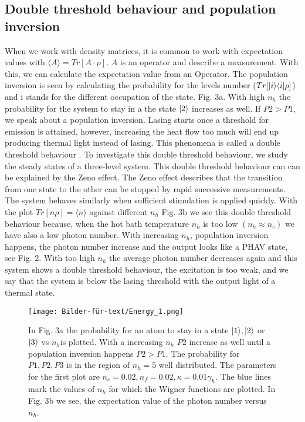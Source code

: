 \documentclass[12pt,a4paper]{article}
\DeclarePairedDelimiter\bra{\langle}{\rvert}
\DeclarePairedDelimiter\ket{\lvert}{\rangle}
\begin{document}
\newpage
\subsection{Double threshold behaviour and population inversion}
 When we work with density matrices, it is common to work with expectation values with $\langle A \rangle=Tr[A\cdot\rho]$.
 $A$ is an operator and describe a measurement.
With this, we can calculate the expectation value from an Operator. 
The population inversion is seen by calculating the probability for the levels number ($Tr[\ket{i}\bra{i} \rho]$) and i stands for the different occupation of the state. Fig. 3a.  With high $n_h$ the probability for the system to stay in a the state $\ket{2}$ increases as well. If $P2>P1$, we speak about a population inversion.  
Lasing starts once a threshold for emission is attained, however, increasing the heat flow too much will end up producing  thermal light instead of lasing. This phenomena is called a double threshold behaviour \cite{Li2017}. To investigate this double threshold behaviour, we study the steady states of a three-level system.
This double threshold behaviour can can be explained by the Zeno effect. 
The Zeno effect describes that the transition from one state to the other can be stopped by rapid successive measurements. 
The system behaves similarly when sufficient stimulation is applied quickly. 
With the plot  $Tr[n\rho] =\langle n\rangle$ against different $n_h$ Fig. 3b we see this double threshold behaviour because, when the hot bath temperature $n_h$ is too low $(n_h \approx n_c)$ we have also a  low photon number. With increasing $n_h$, population inversion happens, the photon number increase and the output looks like a PHAV state,  see  Fig. 2. With too high $n_h$ the average photon number decreases again and this system shows a double threshold behaviour, the excitation is too weak, and we say that the system is below the lasing threshold with the output light of a thermal state.
\begin{figure}[h!]
\hspace{-1cm}
\texttt{[image: Bilder-für-text/Energy\_1.png]}
\caption{In Fig. 3a the probability for an atom to stay in a state $\ket{1}, \ket{2}$ or $\ket{3}$ vs $n_h$is plotted. With a increasing $n_h$ $P2$ increase as well until a population inversion happens $P2>P1$. The probability for $P1,P2,P3$ is in the region of $n_h=5 $ well distributed. The parameters for the first plot are $n_c=0.02 ,n_f=0.02,\kappa=0.01\gamma_h $. The blue lines mark the values of $ n_h$ for which the Wigner functions are plotted. In Fig. 3b we see, the expectation value of the photon number versus $n_h$.}
\end{figure}
\end{document}
